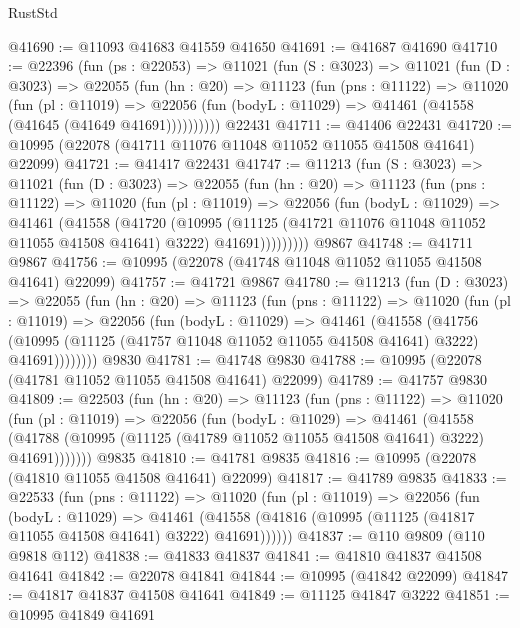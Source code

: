 \begin{lexlean}{RustStd}
\begin{coremodule}
@41690 := @11093 @41683 @41559 @41650
@41691 := @41687 @41690
@41710 := @22396
    (fun (ps : @22053) =>
    @11021
      (fun (S : @3023) =>
      @11021
        (fun (D : @3023) =>
        @22055
          (fun (hn : @20) =>
          @11123
            (fun (pns : @11122) =>
            @11020
              (fun (pl : @11019) =>
              @22056 (fun (bodyL : @11029) => @41461 (@41558 (@41645 (@41649 @41691))))))))))
    @22431
@41711 := @41406 @22431
@41720 := @10995 (@22078 (@41711 @11076 @11048 @11052 @11055 @41508 @41641) @22099)
@41721 := @41417 @22431
@41747 := @11213
    (fun (S : @3023) =>
    @11021
      (fun (D : @3023) =>
      @22055
        (fun (hn : @20) =>
        @11123
          (fun (pns : @11122) =>
          @11020
            (fun (pl : @11019) =>
            @22056
              (fun (bodyL : @11029) =>
              @41461
                (@41558
                  (@41720
                    (@10995
                      (@11125 (@41721 @11076 @11048 @11052 @11055 @41508 @41641) @3222)
                      @41691)))))))))
    @9867
@41748 := @41711 @9867
@41756 := @10995 (@22078 (@41748 @11048 @11052 @11055 @41508 @41641) @22099)
@41757 := @41721 @9867
@41780 := @11213
    (fun (D : @3023) =>
    @22055
      (fun (hn : @20) =>
      @11123
        (fun (pns : @11122) =>
        @11020
          (fun (pl : @11019) =>
          @22056
            (fun (bodyL : @11029) =>
            @41461
              (@41558
                (@41756
                  (@10995 (@11125 (@41757 @11048 @11052 @11055 @41508 @41641) @3222) @41691))))))))
    @9830
@41781 := @41748 @9830
@41788 := @10995 (@22078 (@41781 @11052 @11055 @41508 @41641) @22099)
@41789 := @41757 @9830
@41809 := @22503
    (fun (hn : @20) =>
    @11123
      (fun (pns : @11122) =>
      @11020
        (fun (pl : @11019) =>
        @22056
          (fun (bodyL : @11029) =>
          @41461
            (@41558
              (@41788 (@10995 (@11125 (@41789 @11052 @11055 @41508 @41641) @3222) @41691)))))))
    @9835
@41810 := @41781 @9835
@41816 := @10995 (@22078 (@41810 @11055 @41508 @41641) @22099)
@41817 := @41789 @9835
@41833 := @22533
    (fun (pns : @11122) =>
    @11020
      (fun (pl : @11019) =>
      @22056
        (fun (bodyL : @11029) =>
        @41461 (@41558 (@41816 (@10995 (@11125 (@41817 @11055 @41508 @41641) @3222) @41691))))))
@41837 := @110 @9809 (@110 @9818 @112)
@41838 := @41833 @41837
@41841 := @41810 @41837 @41508 @41641
@41842 := @22078 @41841
@41844 := @10995 (@41842 @22099)
@41847 := @41817 @41837 @41508 @41641
@41849 := @11125 @41847 @3222
@41851 := @10995 @41849 @41691

\end{coremodule}
\end{lexlean}
